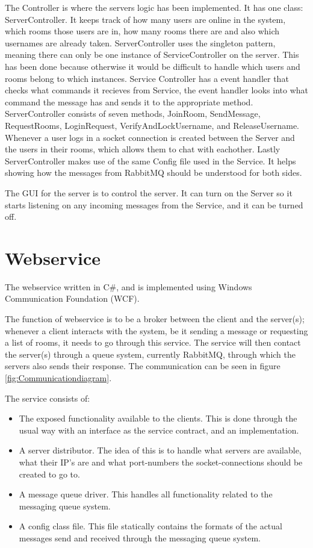 The Controller is where the servers logic has been implemented. It has one class: ServerController. It keeps track of how many users are online in the system, which rooms those users are in, how many rooms there are and also which usernames are already taken. ServerController uses the singleton pattern, meaning there can only be one instance of ServiceController on the server. This has been done because otherwise it would be difficult to handle which users and rooms belong to which instances. Service Controller has a event handler that checks what commands it recieves from Service, the event handler looks into what command the message has and sends it to the appropriate method. ServerController consists of seven methods, JoinRoom, SendMessage, RequestRooms, LoginRequest, VerifyAndLockUsername, and ReleaseUsername. Whenever a user logs in a socket connection is created between the Server and the users in their rooms, which allows them to chat with eachother. Lastly ServerController makes use of the same Config file used in the Service. It helps showing how the messages from RabbitMQ should be understood for both sides.



The GUI for the server is to control the server. It can turn on the Server so it starts listening on any incoming messages from the Service, and it can be turned off. 


\section{Webservice}
The webservice written in C\#, and is implemented using Windows Communication Foundation (WCF). 

The function of webservice is to be a broker between the client and the server(s); whenever a client interacts with the system, be it sending a message or requesting a list of rooms, it needs to go through this service. The service will then  contact the server(s) through a queue system, currently RabbitMQ, through which the servers also sends their response. The communication can be seen in figure \ref{fig:Communicationdiagram}.

The service consists of:
\begin{itemize}
 \item The exposed functionality available to the clients. This is done through the usual way with an interface as the service contract, and an implementation.

 \item A server distributor. The idea of this is to handle what servers are available, what their IP's are and what port-numbers the socket-connections should be created to go to. 
 
 \item A message queue driver. This handles all functionality related to the messaging queue system.
 
 \item A config class file. This file statically contains the formats of the actual messages send and received through the messaging queue system.

\end{itemize}

